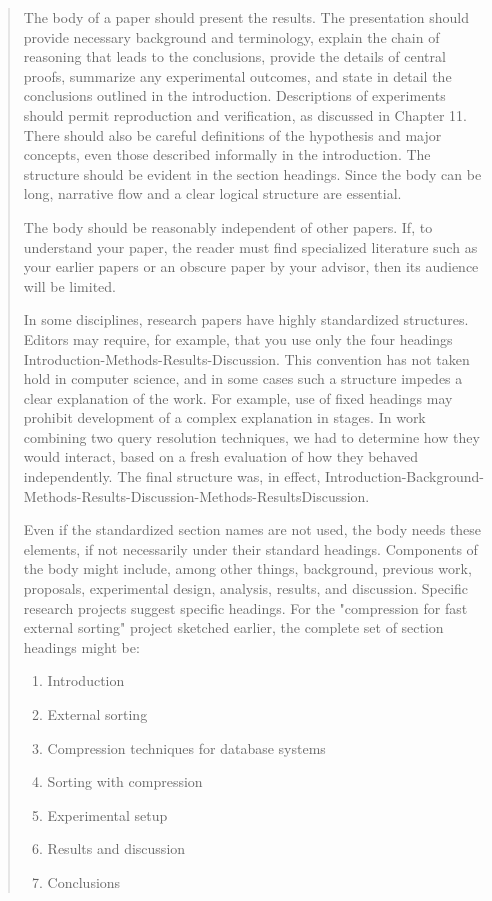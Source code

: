 \documentclass[a4paper,oneside,bibliography=totoc]{scrbook}
\begin{document}
\blockcquote{zobel2004}{%
  The body of a paper should present the results. The presentation should
  provide necessary background and terminology, explain the chain of reasoning
  that leads to the conclusions, provide the details of central proofs,
  summarize any experimental outcomes, and state in detail the conclusions
  outlined in the introduction. Descriptions of experiments should permit
  reproduction and verification, as discussed in Chapter 11. There should also
  be careful definitions of the hypothesis and major concepts, even those
  described informally in the introduction. The structure should be evident in
  the section headings. Since the body can be long, narrative flow and a clear
  logical structure are essential.

  The body should be reasonably independent of other papers. If, to understand
  your paper, the reader must find specialized literature such as your earlier
  papers or an obscure paper by your advisor, then its audience will be limited.

  In some disciplines, research papers have highly standardized structures.
  Editors may require, for example, that you use only the four headings
  Introduction-Methods-Results-Discussion. This convention has not taken hold in
  computer science, and in some cases such a structure impedes a clear
  explanation of the work. For example, use of fixed headings may prohibit
  development of a complex explanation in stages. In work combining two query
  resolution techniques, we had to determine how they would interact, based on a
  fresh evaluation of how they behaved independently. The final structure was,
  in effect,
  Introduction-Background-Methods-Results-Discussion-Methods-Results­Discussion.

  Even if the standardized section names are not used, the body needs these
  elements, if not necessarily under their standard headings. Components of the
  body might include, among other things, background, previous work, proposals,
  experimental design, analysis, results, and discussion. Specific research
  projects suggest specific headings. For the "compression for fast external
  sorting" project sketched earlier, the complete set of section headings might
  be:

  \begin{enumerate}
  \item Introduction
  \item External sorting
  \item Compression techniques for database systems
  \item Sorting with compression
  \item Experimental setup
  \item Results and discussion
  \item Conclusions
  \end{enumerate}

}
\end{document}
